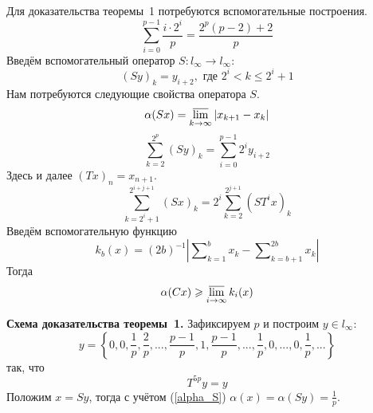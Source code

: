 Для доказательства теоремы~1 потребуются вспомогательные построения.
\begin{equation}\label{summa_drobey}
	\sum_{i=0}^{p-1} \frac{i \cdot 2^i}{p} = \frac{2^p(p-2) + 2}{p}
\end{equation}
Введём вспомогательный оператор $S:l_\infty \to l_\infty$:
\begin{equation*}\label{operator_S}
	(Sy)_k = y_{i+2}, \mbox{ где } 2^i < k \leqslant 2^i+1
\end{equation*}
Нам потребуются следующие свойства оператора $S$.
\begin{equation}\label{alpha_S}
	\alpha(Sx) = \varlimsup_{k\to\infty} |x_{k+1} - x_{k}|
\end{equation}
\begin{equation}\label{summa_S_less}
	\sum_{k=2}^{2^p} (Sy)_k =
	\sum_{i=0}^{p-1} 2^i y_{i+2}
\end{equation}
Здесь и далее $(Tx)_n = x_{n+1}$.
\begin{equation}\label{summa_S}
	\sum_{k=2^i+1}^{2^{i+j+1}} (Sx)_k =
	2^i\sum_{k=2}^{2^{j+1}} (ST^ix)_k
\end{equation}
Введём вспомогательную функцию
\begin{equation*}\label{def_k_b}
	k_b(x) = (2b)^{-1} \left|
		\sum\nolimits_{k=1}^{b}x_k - \sum\nolimits_{k=b+1}^{2b}x_k
	\right|
\end{equation*}
Тогда
\begin{equation}\label{alpha_greater_k_b}
	\alpha (Cx) \geqslant \varlimsup_{i\to \infty} k_i(x)
\end{equation}

\textbf{Схема доказательства теоремы~1.}
Зафиксируем $p$ и построим $y\in l_\infty$:
\begin{equation*}\label{y_construction}
	y = \left\{
		0, 0, \frac{1}{p}, \frac{2}{p}, %
		...,
		\frac{p-1}{p}, 1, \frac{p-1}{p},
		...,
		\frac{1}{p},
		0, ..., 0,
		\frac{1}{p}, ...
	\right\}
\end{equation*}
так, что
\begin{equation}\label{T_y}
	T^{5p}y = y
\end{equation}
Положим $x = Sy$, тогда с учётом (\ref{alpha_S})
$
	\alpha (x) = \alpha (Sy) = \frac{1}{p}
$.

